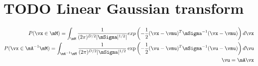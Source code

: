 \section{TODO Linear Gaussian transform}


\begin{align}
  P(\vx \in \mM) = \int_\mM \frac{1}{(2 \pi)^{D/2} |\mSigma|^{1/2}|} exp \left(-\frac{1}{2} (\vx - \vmu)^T \mSigma^{-1} (\vx - \vmu) \right) d \vx \\
  P(\vx \in \mA^{-1} \mM) = \int_{\mA^{-1} \mM} \frac{1}{(2 \pi)^{D/2} |\mSigma|^{1/2}} \exp \left(-\frac{1}{2} (\vu - \vmu)^T \mSigma^{-1} (\vu - \vmu) \right) d \vu \\
  \vu = \mA \vx
\end{align}
